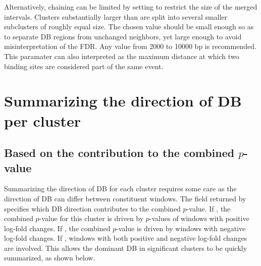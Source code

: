 \documentclass{report}\usepackage[]{graphicx}\usepackage[usenames,dvipsnames]{color}
\newcommand{\hlnum}[1]{\textcolor[rgb]{0.816,0.125,0.439}{#1}}%
\newcommand{\hlopt}[1]{\textcolor[rgb]{0,0,0}{#1}}%
\newcommand{\hlstd}[1]{\textcolor[rgb]{0.251,0.251,0.251}{#1}}%
\newcommand{\hlkwb}[1]{\textcolor[rgb]{0,0,0}{#1}}%
\newcommand{\hlkwc}[1]{\textcolor[rgb]{0.251,0.251,0.251}{#1}}%
\newcommand{\hlkwd}[1]{\textcolor[rgb]{0.878,0.439,0.125}{#1}}%
\newenvironment{knitrout}{}{} %
\begin{document}
Alternatively, chaining can be limited by setting  to restrict the size of the merged intervals. 
Clusters substantially larger than  are split into several smaller subclusters of roughly equal size.
The chosen value should be small enough so as to separate DB regions from unchanged neighbors, yet large enough to avoid misinterpretation of the FDR.
Any value from 2000 to 10000 bp is recommended. 
This paramater can also interpreted as the maximum distance at which two binding sites are considered part of the same event.

\begin{knitrout}
\color{fgcolor}
\end{knitrout}

\section{Summarizing the direction of DB per cluster}

\subsection{Based on the contribution to the combined $p$-value}
Summarizing the direction of DB for each cluster requires some care as the direction of DB can differ between constituent windows.
The  field returned by  specifies which DB direction contributes to the combined $p$-value.
If , the combined $p$-value for this cluster is driven by $p$-values of windows with positive log-fold changes.
If , the combined $p$-value is driven by windows with negative log-fold changes.
If , windows with both positive and negative log-fold changes are involved.
This allows the dominant DB in significant clusters to be quickly summarized, as shown below.
\end{document}
